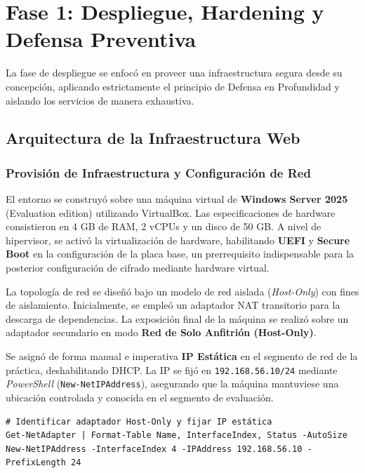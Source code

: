 \chapter[Fase 1: Despliegue y Hardening]{Fase 1: Despliegue, Hardening y Defensa Preventiva}
\label{chap:fase_1_despliegue_hardening}

La fase de despliegue se enfocó en proveer una infraestructura segura desde su concepción, aplicando estrictamente el principio de Defensa en Profundidad y aislando los servicios de manera exhaustiva.

\section[Arquitectura de la Infraestructura Web]{Arquitectura de la Infraestructura Web}
\label{sec:arquitectura_infraestructura}

\subsection{Provisión de Infraestructura y Configuración de Red}
El entorno se construyó sobre una máquina virtual de \textbf{Windows Server 2025} (Evaluation edition) utilizando VirtualBox. Las especificaciones de hardware consistieron en 4 GB de RAM, 2 vCPUs y un disco de 50 GB. A nivel de hipervisor, se activó la virtualización de hardware, habilitando \textbf{UEFI} y \textbf{Secure Boot} en la configuración de la placa base, un prerrequisito indispensable para la posterior configuración de cifrado mediante hardware virtual.

La topología de red se diseñó bajo un modelo de red aislada (\textit{Host-Only}) con fines de aislamiento. Inicialmente, se empleó un adaptador NAT transitorio para la descarga de dependencias. La exposición final de la máquina se realizó sobre un adaptador secundario en modo \textbf{Red de Solo Anfitrión (Host-Only)}. 

Se asignó de forma manual e imperativa \textbf{IP Estática} en el segmento de red de la práctica, deshabilitando DHCP. La IP se fijó en \texttt{192.168.}\allowbreak\texttt{56.10/24} mediante \textit{PowerShell} (\texttt{New-NetIPAddress}), asegurando que la máquina mantuviese una ubicación controlada y conocida en el segmento de evaluación.

\begin{lstlisting}
# Identificar adaptador Host-Only y fijar IP estática
Get-NetAdapter | Format-Table Name, InterfaceIndex, Status -AutoSize
New-NetIPAddress -InterfaceIndex 4 -IPAddress 192.168.56.10 -PrefixLength 24
\end{lstlisting}

